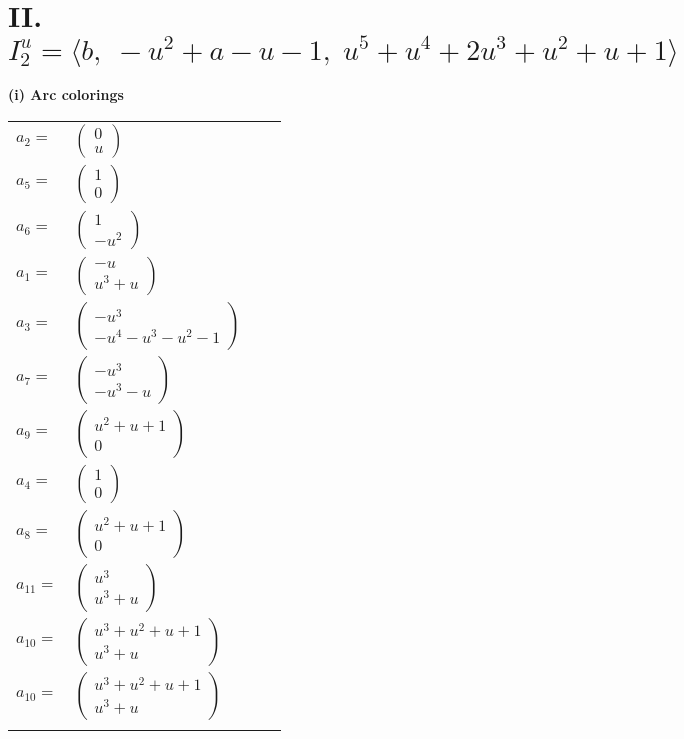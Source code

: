 \documentclass[1p]{elsarticle_modified}
\theoremstyle{definition}
\begin{document}
\centering \section*{II. $I^u_{2}= \langle b,\;- u^2+a- u-1,\;u^5+u^4+2 u^3+u^2+u+1 \rangle$}
\flushleft \textbf{(i) Arc colorings}\\
\begin{tabular}{m{7pt} m{180pt} m{7pt} m{180pt} }
\flushright $a_{2}=$&$\begin{pmatrix}0\\u\end{pmatrix}$ \\
\flushright $a_{5}=$&$\begin{pmatrix}1\\0\end{pmatrix}$ \\
\flushright $a_{6}=$&$\begin{pmatrix}1\\- u^2\end{pmatrix}$ \\
\flushright $a_{1}=$&$\begin{pmatrix}- u\\u^3+u\end{pmatrix}$ \\
\flushright $a_{3}=$&$\begin{pmatrix}- u^3\\- u^4- u^3- u^2-1\end{pmatrix}$ \\
\flushright $a_{7}=$&$\begin{pmatrix}- u^3\\- u^3- u\end{pmatrix}$ \\
\flushright $a_{9}=$&$\begin{pmatrix}u^2+u+1\\0\end{pmatrix}$ \\
\flushright $a_{4}=$&$\begin{pmatrix}1\\0\end{pmatrix}$ \\
\flushright $a_{8}=$&$\begin{pmatrix}u^2+u+1\\0\end{pmatrix}$ \\
\flushright $a_{11}=$&$\begin{pmatrix}u^3\\u^3+u\end{pmatrix}$ \\
\flushright $a_{10}=$&$\begin{pmatrix}u^3+u^2+u+1\\u^3+u\end{pmatrix}$\\ \flushright $a_{10}=$&$\begin{pmatrix}u^3+u^2+u+1\\u^3+u\end{pmatrix}$\\&\end{tabular}
\end{document}
